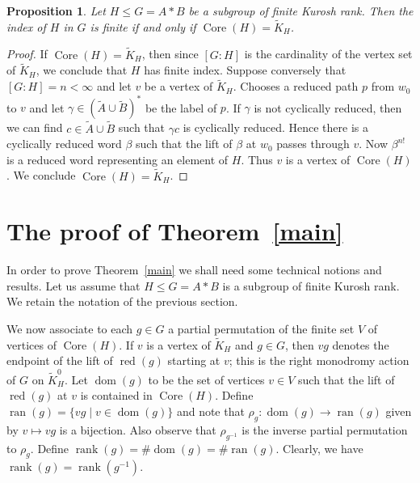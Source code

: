 \documentclass[11pt,reqno]{amsart}
\newtheorem{Prop}[Thm]{Proposition}
\begin{document}
\begin{Prop}\label{completecomplex}
Let $H\leq G=A\ast B$ be a subgroup of finite Kurosh rank.  Then the index of $H$ in $G$ is finite if and only if ${\mathop{\mathrm{Core}}\nolimits}(H)={\ensuremath{\widetilde {K}}}_H$.
\end{Prop}
\begin{proof}
If ${\mathop{\mathrm{Core}}\nolimits}(H)={\ensuremath{\widetilde {K}}}_H$, then since $[G:H]$ is the cardinality of the vertex set of ${\ensuremath{\widetilde {K}}}_H$, we conclude that $H$ has finite index. Suppose conversely that $[G:H]=n<\infty$ and let $v$ be a vertex of ${\ensuremath{\widetilde {K}}}_H$.  Chooses a reduced path $p$ from $w_0$ to $v$ and let $\gamma\in ({\ensuremath{\widetilde {A}}}\cup {\ensuremath{\widetilde {B}}})^*$ be the label of $p$.  If $\gamma$ is not cyclically reduced, then we can find $c\in {\ensuremath{\widetilde {A}}}\cup {\ensuremath{\widetilde {B}}}$ such that $\gamma c$ is cyclically reduced.  Hence there is a cyclically reduced word $\beta$ such that the lift of $\beta$ at $w_0$ passes through $v$.  Now $\beta^{n!}$ is a reduced word representing an element of $H$.   Thus $v$ is a vertex of ${\mathop{\mathrm{Core}}\nolimits}(H)$.  We conclude ${\mathop{\mathrm{Core}}\nolimits}(H)={\ensuremath{\widetilde {K}}}_H$.
\end{proof}

\section{The proof of Theorem~\ref{main}}

In order to prove Theorem~\ref{main} we shall need some technical notions and results.  Let us assume that $H\leq  G=A\ast B$ is a subgroup of finite Kurosh rank.  We retain the notation of the previous section.

We now associate to each $g\in G$ a partial permutation of the finite set $V$ of vertices of ${\mathop{\mathrm{Core}}\nolimits}(H)$.
If $v$ is a vertex of ${\ensuremath{\widetilde {K}}}_H$ and $g\in G$, then $vg$ denotes the endpoint of the lift of ${\mathop{\mathrm{red}}\nolimits}(g)$ starting at $v$;  this is the right monodromy action of $G$ on ${\ensuremath{\widetilde {K}}}_H^0$.  Let ${\mathop{\mathrm {dom}}\nolimits}(g)$ to be the set of vertices $v\in V$ such that the lift of ${\mathop{\mathrm{red}}\nolimits}(g)$ at $v$ is contained in ${\mathop{\mathrm{Core}}\nolimits}(H)$.  Define ${\mathop{\mathrm {ran}}\nolimits}(g)=\{vg\mid v\in {\mathop{\mathrm {dom}}\nolimits}(g)\}$ and note that $\rho_g\colon {\mathop{\mathrm {dom}}\nolimits}(g){\rightarrow} {\mathop{\mathrm {ran}}\nolimits}(g)$ given by $v\mapsto vg$ is a bijection.  Also observe that $\rho_{g{^{-1}}}$ is the inverse partial permutation to $\rho_g$.  Define ${\mathop{\mathrm{rank}}}(g)=\#{\mathop{\mathrm {dom}}\nolimits}(g)=\#{\mathop{\mathrm {ran}}\nolimits}(g)$.  Clearly, we have ${\mathop{\mathrm{rank}}}(g)={\mathop{\mathrm{rank}}}(g{^{-1}})$.
\end{document}
